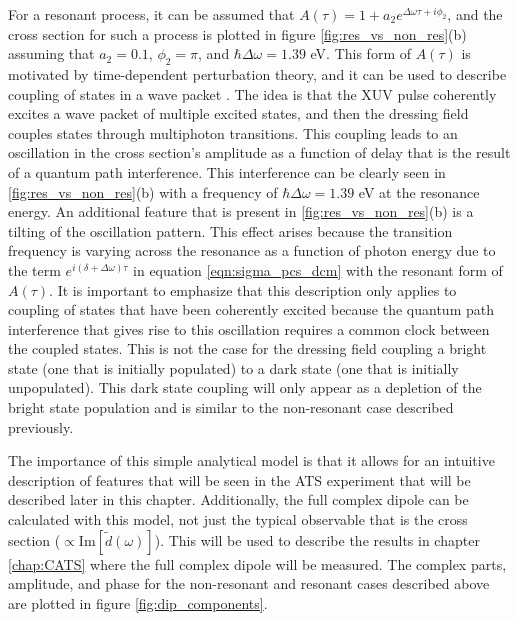For a resonant process, it can be assumed that $A(\tau)=1+a_2e^{\Delta\omega\tau + i\phi_2}$, and the cross section for such a process is plotted in figure \ref{fig:res_vs_non_res}(b) assuming that $a_2=0.1$, $\phi_2=\pi$, and $\hbar\Delta\omega = 1.39$ eV.  This form of $A(\tau)$ is motivated by time-dependent perturbation theory, and it can be used to describe coupling of states in a wave packet \cite{blattermannImpulsiveControlAtomic2016, blattermannTwodimensionalSpectralInterpretation2014, ottReconstructionControlTimedependent2014, kaldunFanoResonancesTime2014}.  The idea is that the XUV pulse coherently excites a wave packet of multiple excited states, and then the dressing field couples states through multiphoton transitions. This coupling leads to an oscillation in the cross section's amplitude as a function of delay that is the result of a quantum path interference.  This interference can be clearly seen in \ref{fig:res_vs_non_res}(b) with a frequency of $\hbar\Delta\omega=1.39$ eV at the resonance energy.  An additional feature that is present in \ref{fig:res_vs_non_res}(b) is a tilting of the oscillation pattern.  This effect arises because the transition frequency is varying across the resonance as a function of photon energy due to the term $e^{i(\delta+\Delta\omega)\tau}$ in equation \ref{eqn:sigma_pcs_dcm} with the resonant form of $A(\tau)$.  It is important to emphasize that this description only applies to coupling of states that have been coherently excited because the quantum path interference that gives rise to this oscillation requires a common clock between the coupled states.  This is not the case for the dressing field coupling a bright state (one that is initially populated) to a dark state (one that is initially unpopulated).  This dark state coupling will only appear as a depletion of the bright state population and is similar to the non-resonant case described previously.

The importance of this simple analytical model is that it allows for an intuitive description of features that will be seen in the ATS experiment that will be described later in this chapter.  Additionally, the full complex dipole can be calculated with this model, not just the typical observable that is the cross section ($\propto\mathrm{Im}[\tilde{d}(\omega)]$).  This will be used to describe the results in chapter \ref{chap:CATS} where the full complex dipole will be measured.  The complex parts, amplitude, and phase for the non-resonant and resonant cases described above are plotted in  figure \ref{fig:dip_components}.

